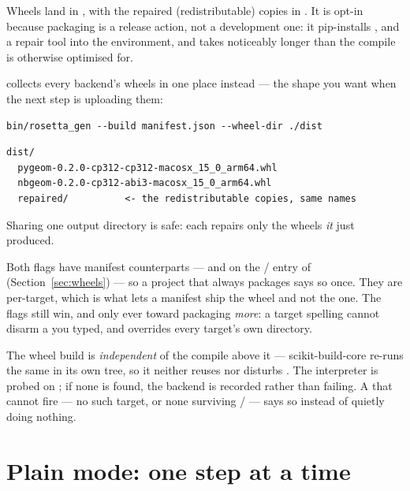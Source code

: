 Wheels land in , with the repaired
(redistributable) copies in . It is opt-in because
packaging is a release action, not a development one: it pip-installs
,  and a repair tool into the environment,
and takes noticeably longer than the compile  is otherwise
optimised for.

 collects every backend's wheels in one place instead --- the
shape you want when the next step is uploading them:

\begin{lstlisting}[style=sh]
bin/rosetta_gen --build manifest.json --wheel-dir ./dist
\end{lstlisting}

\begin{lstlisting}[style=plain]
dist/
  pygeom-0.2.0-cp312-cp312-macosx_15_0_arm64.whl
  nbgeom-0.2.0-cp312-abi3-macosx_15_0_arm64.whl
  repaired/          <- the redistributable copies, same names
\end{lstlisting}

Sharing one output directory is safe: each  repairs only
the wheels \emph{it} just produced.

Both flags have manifest counterparts ---  and
 on the  /  entry of
 (Section~\ref{sec:wheels}) --- so a project that always
packages says so once. They are per-target, which is what lets a manifest ship
the  wheel and not the  one. The flags still win,
and only ever toward packaging \emph{more}: a target spelling
 cannot disarm a  you typed, and
 overrides every target's own directory.

\begin{note}
The wheel build is \emph{independent} of the compile above it ---
scikit-build-core re-runs the same  in its own tree, so it
neither reuses nor disturbs . The interpreter is probed on
; if none is found, the backend is recorded
 rather than failing. A
 that cannot fire --- no such target, or none surviving
/ --- says so instead of quietly doing nothing.
\end{note}

\section{Plain mode: one step at a time}

